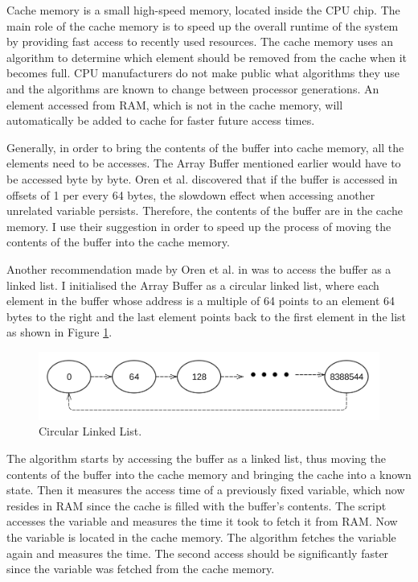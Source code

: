 \documentclass[10pt,a4paper,twoside]{book}
\begin{document}
Cache memory is a small high-speed memory, located inside the CPU chip. The main role of the cache memory is to speed up the overall runtime of the system by providing fast access to recently used resources. The cache memory uses an algorithm to determine which element should be removed from the cache when it becomes full. CPU manufacturers do not make public what algorithms they use and the algorithms are known to change between processor generations. An element accessed from RAM, which is not in the cache memory, will automatically be added to cache for faster future access times. 

Generally, in order to bring the contents of the buffer into cache memory, all the elements need to be accesses. The Array Buffer mentioned earlier would have to be accessed byte by byte. Oren et al. discovered that if the buffer is accessed in offsets of 1 per every 64 bytes, the slowdown effect when accessing another unrelated variable persists. Therefore, the contents of the buffer are in the cache memory. I use their suggestion in order to speed up the process of moving the contents of the buffer into the cache memory.

Another recommendation made by Oren et al. in \cite{oren2015spy} was to access the buffer as a linked list. I initialised the Array Buffer as a circular linked list, where each element in the buffer whose address is a multiple of 64 points to an element 64 bytes to the right and the last element points back to the first element in the list as shown in Figure \ref{circularlinkedlist}.

\begin{figure}[h]
\centering
\includegraphics[width=\textwidth]{figures/circularlinkedlist.png}
\caption{Circular Linked List.}
\label{circularlinkedlist}
\end{figure}

The algorithm starts by accessing the buffer as a linked list, thus moving the contents of the buffer into the cache memory and bringing the cache into a known state. Then it measures the access time of a previously fixed variable, which now resides in RAM since the cache is filled with the buffer's contents. The script accesses the variable and measures the time it took to fetch it from RAM. Now the variable is located in the cache memory. The algorithm fetches the variable again and measures the time. The second access should be significantly faster since the variable was fetched from the cache memory.
\end{document}
